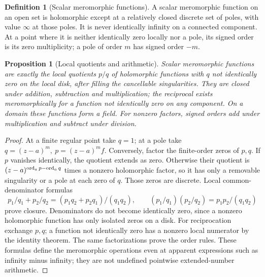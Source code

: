 \documentclass[11pt,a4paper,openany]{book}
\newtheorem{proposition}[theorem]{Proposition}
\theoremstyle{definition}
\newtheorem{definition}[theorem]{Definition}
\theoremstyle{remark}\newtheorem{remark}[theorem]{Remark}
\newcommand{\family}[1]{}
\begin{document}
\begin{definition}[Scalar meromorphic functions]\family{D12.07.04}\label{d12:07-04}
A scalar meromorphic function on an open set is holomorphic except at
a relatively closed discrete set of poles, with value \(\infty\) at those poles.
It is never identically infinity on a connected component.
At a point where it is neither identically zero locally nor a pole,
its signed order is its zero multiplicity; a pole of order \(m\) has
signed order \(-m\).
\end{definition}
\begin{proposition}[Local quotients and arithmetic]\label{d12:07-04-quotients}
Scalar meromorphic functions are exactly the local quotients \(p/q\)
of holomorphic functions with \(q\) not identically zero on the local
disk, after filling the cancellable singularities.
They are closed under addition, subtraction and multiplication;
the reciprocal exists meromorphically for a function not identically
zero on any component. On a domain these functions form a field.
For nonzero factors, signed orders add under multiplication and subtract
under division.
\end{proposition}
\begin{proof}
At a finite regular point take \(q=1\); at a pole take
\(q=(z-a)^m,\ p=(z-a)^mf\). Conversely, factor the finite-order zeros
of \(p,q\). If \(p\) vanishes identically, the quotient extends as zero.
Otherwise their quotient is
\((z-a)^{\operatorname{ord}_a p-\operatorname{ord}_a q}\) times a nonzero holomorphic factor,
so it has only a removable singularity or a pole at each zero of \(q\).
Those zeros are discrete. Local common-denominator formulas
\[
 p_1/q_1+p_2/q_2=(p_1q_2+p_2q_1)/(q_1q_2),
 \qquad (p_1/q_1)(p_2/q_2)=p_1p_2/(q_1q_2)
\]
prove closure. Denominators do not become identically zero, since a
nonzero holomorphic function has only isolated zeros on a disk.
For reciprocation exchange \(p,q\); a function not identically zero
has a nonzero local numerator by the identity theorem.
The same factorizations prove the order rules.
These formulas define the meromorphic operations even at apparent
expressions such as infinity minus infinity; they are not undefined
pointwise extended-number arithmetic.
\end{proof}
\end{document}
